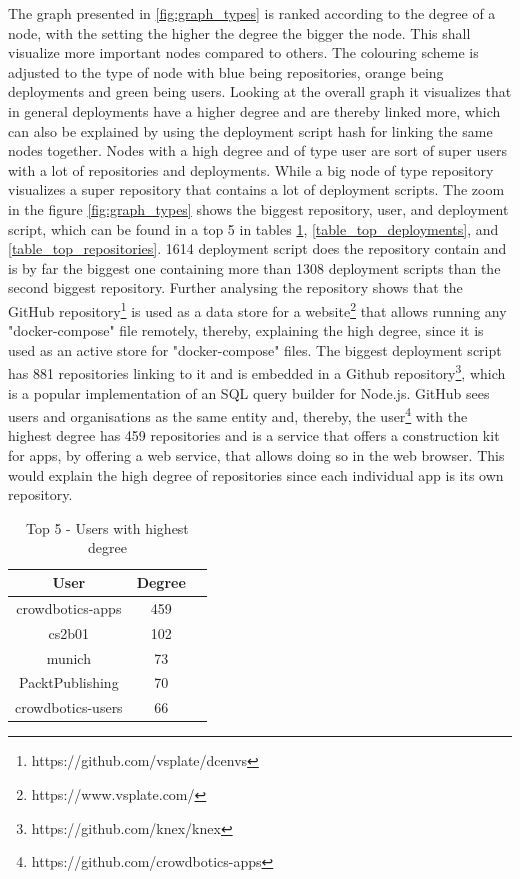 The graph presented in \ref{fig:graph_types} is ranked according to the degree of a node, with the setting the higher the degree the bigger the node. This shall visualize more important nodes compared to others. The colouring scheme is adjusted to the type of node with blue being repositories, orange being deployments and green being users. Looking at the overall graph it visualizes that in general deployments have a higher degree and are thereby linked more, which can also be explained by using the deployment script hash for linking the same nodes together. Nodes with a high degree and of type user are sort of super users with a lot of repositories and deployments. While a big node of type repository visualizes a super repository that contains a lot of deployment scripts.
The zoom in the figure \ref{fig:graph_types} shows the biggest repository, user, and deployment script, which can be found in a top 5 in tables \ref{table_top_users}, \ref{table_top_deployments}, and \ref{table_top_repositories}.
1614 deployment script does the repository contain and is by far the biggest one containing more than 1308 deployment scripts than the second biggest repository. Further analysing the repository shows that the GitHub repository\footnote{https://github.com/vsplate/dcenvs} is used as a data store for a website\footnote{https://www.vsplate.com/} that allows running any "docker-compose" file remotely, thereby, explaining the high degree, since it is used as an active store for "docker-compose" files.
The biggest deployment script has 881 repositories linking to it and is embedded in a Github repository\footnote{https://github.com/knex/knex}, which is a popular implementation of an SQL query builder for Node.js.
GitHub sees users and organisations as the same entity and, thereby, the user\footnote{https://github.com/crowdbotics-apps} with the highest degree has 459 repositories and is a service that offers a construction kit for apps, by offering a web service, that allows doing so in the web browser. This would explain the high degree of repositories since each individual app is its own repository.

\begin{table}[h!]
    \centering
    \begin{tabular}{ |c|c|c| }
    \hline
    User & Degree \\
    \hline
         crowdbotics-apps & 459\\
         cs2b01 & 102\\
         munich & 73\\
         PacktPublishing & 70\\
         crowdbotics-users & 66\\
    \hline
    \end{tabular}
    \caption{Top 5 - Users with highest degree}
    \label{table_top_users}
\end{table}

